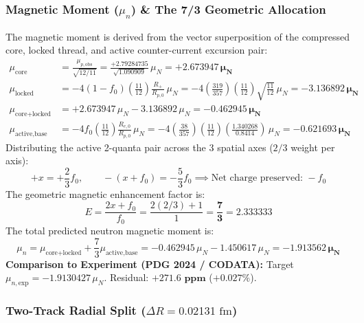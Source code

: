 \documentclass[11pt,a4paper]{article}
\begin{document}
\subsubsection{Magnetic Moment ($\mu_n$) \& The 7/3 Geometric Allocation}
\label{subsubsec:magnetic_moment}

The magnetic moment is derived from the vector superposition of the compressed core, locked thread, and active counter-current excursion pair:
\begin{align}
\mu_{\text{core}} &= \frac{\mu_{p,\text{obs}}}{\sqrt{12/11}} = \frac{+2.79284735}{\sqrt{1.090909}}\,\mu_N = \mathbf{+2.673947\,\mu_N}\\
\mu_{\text{locked}} &= -4(1 - f_0)\left(\frac{11}{12}\right)\frac{R_+}{R_{p,0}}\,\mu_N = -4\left(\frac{319}{357}\right)\left(\frac{11}{12}\right)\sqrt{\frac{11}{12}}\,\mu_N = \mathbf{-3.136892\,\mu_N}\\
\mu_{\text{core+locked}} &= +2.673947\,\mu_N - 3.136892\,\mu_N = \mathbf{-0.462945\,\mu_N}\\
\mu_{\text{active,base}} &= -4 f_0 \left(\frac{11}{12}\right)\frac{R_{e,0}}{R_{p,0}}\,\mu_N = -4\left(\frac{38}{357}\right)\left(\frac{11}{12}\right)\left(\frac{1.340268}{0.8414}\right)\,\mu_N = \mathbf{-0.621693\,\mu_N}
\end{align}
Distributing the active 2-quanta pair across the 3 spatial axes ($2/3$ weight per axis):
\begin{equation}
+x = +\frac{2}{3}f_0, \qquad -(x + f_0) = -\frac{5}{3}f_0 \implies \text{Net charge preserved: } -f_0
\end{equation}
The geometric magnetic enhancement factor is:
\begin{equation}
E = \frac{2x + f_0}{f_0} = \frac{2(2/3) + 1}{1} = \mathbf{\frac{7}{3} = 2.333333}
\end{equation}
The total predicted neutron magnetic moment is:
\begin{equation}
\boxed{\mu_n = \mu_{\text{core+locked}} + \frac{7}{3}\mu_{\text{active,base}} = -0.462945\,\mu_N - 1.450617\,\mu_N = \mathbf{-1.913562\,\mu_N}}
\end{equation}
\textbf{Comparison to Experiment (PDG 2024 / CODATA):} Target $\mu_{n,\text{exp}} = -1.9130427\,\mu_N$. Residual: $\mathbf{+271.6\text{ ppm}}$ ($+0.027\%$).

\subsubsection{Two-Track Radial Split ($\Delta R = 0.02131\text{ fm}$)}
\label{subsubsec:radial_split}
\end{document}
